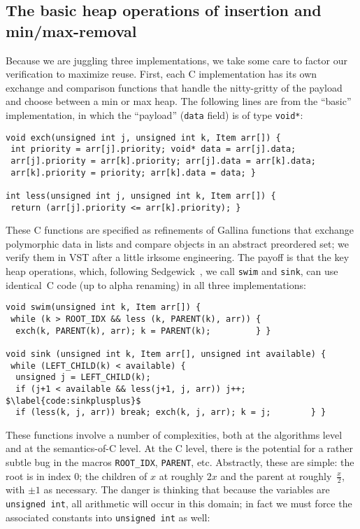 \subsection{The basic heap operations of insertion and min/max-removal}
\label{sec:heapinsertremove}

Because we are juggling three implementations, we take some care to factor our verification to maximize reuse.  First, each C implementation has its own exchange and comparison functions that handle the nitty-gritty of the payload and choose between a min or max heap.  The following lines are from the ``basic'' implementation, in which the ``payload'' (\texttt{data} field) is of type \texttt{void*}:
\begin{lstlisting}
void exch(unsigned int j, unsigned int k, Item arr[]) {
 int priority = arr[j].priority; void* data = arr[j].data;
 arr[j].priority = arr[k].priority; arr[j].data = arr[k].data;
 arr[k].priority = priority; arr[k].data = data; }

int less(unsigned int j, unsigned int k, Item arr[]) {
 return (arr[j].priority <= arr[k].priority); }
\end{lstlisting}
These C functions are specified as refinements of Gallina functions that exchange polymorphic data in lists and compare objects in an abstract preordered set; we verify them in VST after a little irksome engineering.  The payoff is that the key heap operations, which, following Sedgewick~\cite{sedgewick}, we call \texttt{swim} and \texttt{sink}, can use identical~C code (up to alpha renaming) in all three implementations:
\begin{lstlisting}
void swim(unsigned int k, Item arr[]) {
 while (k > ROOT_IDX && less (k, PARENT(k), arr)) {
  exch(k, PARENT(k), arr); k = PARENT(k);         } }

void sink (unsigned int k, Item arr[], unsigned int available) {
 while (LEFT_CHILD(k) < available) {
  unsigned j = LEFT_CHILD(k);
  if (j+1 < available && less(j+1, j, arr)) j++; $\label{code:sinkplusplus}$
  if (less(k, j, arr)) break; exch(k, j, arr); k = j;        } }
\end{lstlisting}
These functions involve a number of complexities, both at the algorithms level and at the semantics-of-C level.  At the C level, there is the potential for a rather subtle bug in the macros \texttt{ROOT\_IDX}, \texttt{PARENT}, etc.  Abstractly, these are simple: the root is in index 0; the children of $x$ at roughly $2x$ and the parent at roughly~$\frac{x}{2}$, with $\pm1$ as necessary.  The danger is thinking that because the variables are \texttt{unsigned int}, all arithmetic will occur in this domain; in fact we must force the associated constants into \texttt{unsigned int} as well:
